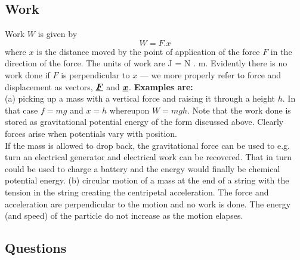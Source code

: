   \subsection{Work}
  Work $W$ is given by
\begin{equation*} 
W = {F}.{x}
\end{equation*}
where ${x}$ is the distance moved by the point of application of the force ${F}$ in the direction of the force.  The units of work are J = N . m. Evidently there is no work done if ${F}$ is perpendicular to ${x}$ --- we more properly refer to force and displacement as vectors, ${\mathit{\underline{\boldsymbol{F}}}}$ and ${\mathit{\underline{\boldsymbol{x}}}}$. \nll
{\bf Examples are:}\\
    (a) picking up a mass with a vertical force and raising it through a height $h$.  In that case $f = mg$ and $x = h$ whereupon $W = mg h$.  Note that the work done is stored as gravitational potential energy of the form discussed above.  Clearly forces arise when potentials vary with position.  \\ If the mass is allowed to drop back, the gravitational force can be used to e.g. turn an electrical generator and electrical work can be recovered.  That in turn could be used to charge a battery and the energy would finally be chemical potential energy.\nll
    (b) circular motion of a mass at the end of a string with the tension in the string creating the centripetal acceleration.  The force and acceleration are perpendicular to the motion and no work is done.  The energy (and speed) of the particle do not increase as the motion elapses.

\subsection*{Questions}
\\

